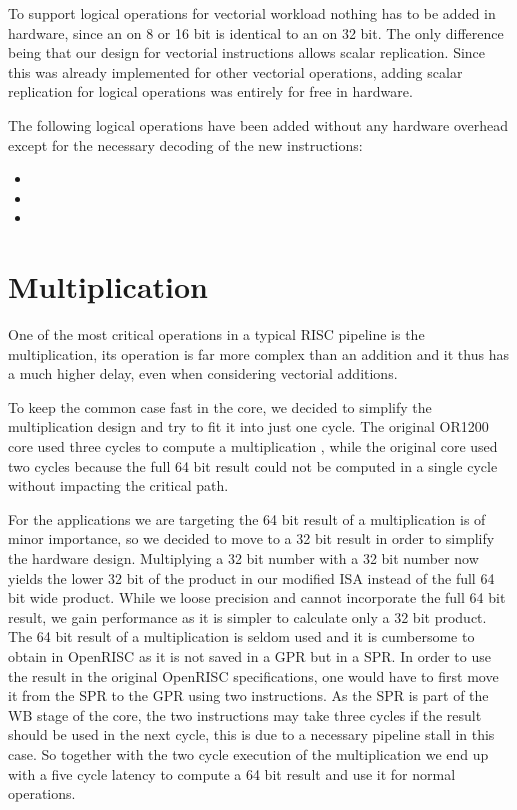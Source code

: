 To support logical operations for vectorial workload nothing has to be added in
hardware, since an  on 8 or 16 bit is identical to an  on
32 bit. The only difference being that our design for vectorial instructions
allows scalar replication. Since this was already implemented for other
vectorial operations, adding scalar replication for logical operations was
entirely for free in hardware.

The following logical operations have been added without any hardware overhead
except for the necessary decoding of the new instructions:
\begin{itemize}
  \item {}
  \item {}
  \item {} 
\end{itemize}



\section{Multiplication}
\label{sec:multiplier}

One of the most critical operations in a typical RISC pipeline is the
multiplication, its operation is far more complex than an addition and it
thus has a much higher delay, even when considering vectorial additions.

To keep the common case fast in the core, we decided to simplify the
multiplication design and try to fit it into just one cycle. The original OR1200
core used three cycles to compute a multiplication \cite{OR1200}, while the
original \orion core used two cycles because the full 64 bit result could not be
computed in a single cycle without impacting the critical path.

For the applications we are targeting the 64 bit result of a multiplication is
of minor importance, so we decided to move to a 32 bit result in order to
simplify the hardware design. Multiplying a 32 bit number with a 32 bit number
now yields the lower 32 bit of the product  in our modified ISA instead of the
full 64 bit wide product.
While we loose precision and cannot incorporate the full 64 bit result, we gain
performance as it is simpler to calculate only a 32 bit product. The 64 bit
result of a multiplication is seldom used and it is cumbersome to obtain in
OpenRISC as it is not saved in a \gls{GPR} but in a \gls{SPR}. In order to
use the result in the original OpenRISC specifications, one would have to first
move it from the \gls{SPR} to the \gls{GPR} using two 
instructions. As the \gls{SPR} is part of the \gls{WB} stage of the core, the
two  instructions may take three cycles if the result should be
used in the next cycle, this is due to a necessary pipeline stall in this case.
So together with the two cycle execution of the multiplication we end up with a
five cycle latency to compute a 64 bit result and use it for normal operations.


